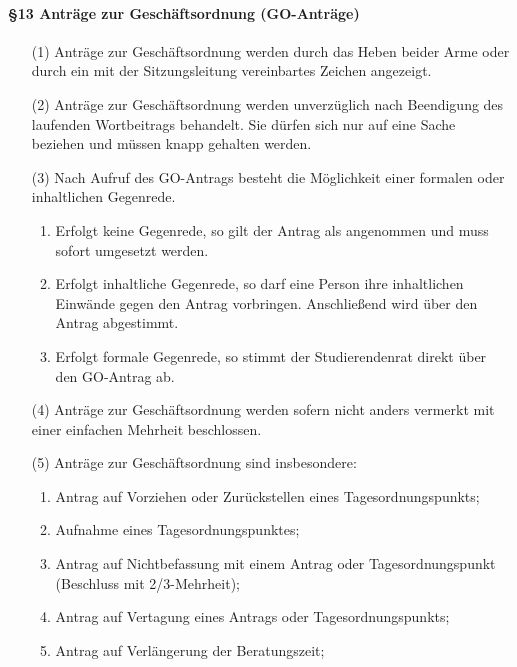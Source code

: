         \paragraph{§13 Anträge zur Geschäftsordnung (GO-Anträge)}
            \begin{itemize}
                \item[(1)] Anträge zur Geschäftsordnung werden durch das Heben beider Arme oder durch ein mit der Sitzungsleitung vereinbartes Zeichen angezeigt. 
                \item[(2)] Anträge zur Geschäftsordnung werden unverzüglich nach Beendigung des laufenden Wortbeitrags behandelt. Sie  dürfen sich nur auf eine Sache beziehen und müssen knapp gehalten werden.
                \item[(3)] Nach Aufruf des GO-Antrags besteht die Möglichkeit einer formalen oder inhaltlichen Gegenrede.
                    \begin{enumerate}
                        \item Erfolgt keine Gegenrede, so gilt der Antrag als angenommen und muss sofort umgesetzt werden. 
                        \item Erfolgt inhaltliche Gegenrede, so darf eine Person ihre inhaltlichen Einwände gegen den Antrag vorbringen. Anschließend wird über den Antrag abgestimmt.
                        \item Erfolgt formale Gegenrede, so stimmt der Studierendenrat direkt über den GO-Antrag ab. 
                    \end{enumerate}
                \item[(4)] Anträge zur Geschäftsordnung werden sofern nicht anders vermerkt mit einer einfachen Mehrheit beschlossen.
                \item[(5)] Anträge zur Geschäftsordnung sind insbesondere:
                    \begin{enumerate}
                        \item Antrag auf Vorziehen oder Zurückstellen eines Tagesordnungspunkts;
                        \item Aufnahme eines Tagesordnungspunktes;
                        \item Antrag auf Nichtbefassung mit einem Antrag oder Tagesordnungspunkt (Beschluss mit 2/3-Mehrheit);
                        \item Antrag auf Vertagung eines Antrags oder Tagesordnungspunkts;
                        \item Antrag auf Verlängerung der Beratungszeit;

\end{enumerate}
\end{itemize}
